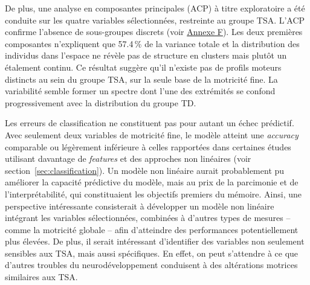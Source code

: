 De plus, une analyse en composantes principales (ACP) à titre exploratoire a été conduite sur les quatre variables sélectionnées, restreinte au groupe TSA. L'ACP confirme l'absence de sous-groupes discrets (voir \hyperref[fig:acp]{Annexe F}). Les deux premières composantes n'expliquent que 57.4\,\% de la variance totale et la distribution des individus dans l'espace ne révèle pas de structure en clusters mais plutôt un étalement continu. Ce résultat suggère qu'il n'existe pas de profils moteurs distincts au sein du groupe TSA, sur la seule base de la motricité fine. La variabilité semble former un spectre dont l'une des extrémités se confond progressivement avec la distribution du groupe TD.

\medskip 

Les erreurs de classification ne constituent pas pour autant un échec prédictif. Avec seulement deux variables de motricité fine, le modèle atteint une \textit{accuracy} comparable ou légèrement inférieure à celles rapportées dans certaines études utilisant davantage de \textit{features} et des approches non linéaires (voir section~\ref{sec:classification}). %
Un modèle non linéaire aurait probablement pu améliorer la capacité prédictive du modèle, mais au prix de la parcimonie et de l'interprétabilité, qui constituaient les objectifs premiers du mémoire. Ainsi, une perspective intéressante consisterait à développer un modèle non linéaire intégrant les variables sélectionnées, combinées à d'autres types de mesures -- comme la motricité globale -- afin d'atteindre des performances potentiellement plus élevées. De plus, il serait intéressant d'identifier des variables non seulement sensibles aux TSA, mais aussi spécifiques. En effet, on peut s'attendre à ce que d'autres troubles du neurodéveloppement conduisent à des altérations motrices similaires aux TSA.

